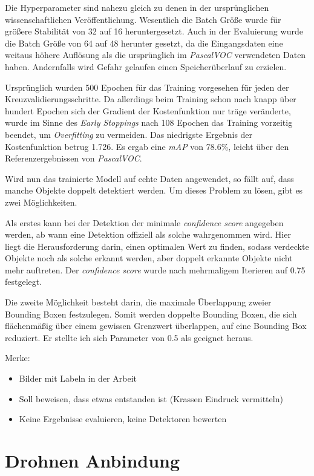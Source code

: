 Die Hyperparameter sind nahezu gleich zu denen in der ursprünglichen wissenschaftlichen Veröffentlichung. Wesentlich die Batch Größe wurde für größere Stabilität von 32 auf 16 heruntergesetzt. Auch in der Evaluierung wurde die Batch Größe von 64 auf 48 herunter gesetzt, da die Eingangsdaten eine weitaus höhere Auflösung als die ursprünglich im \textit{PascalVOC} verwendeten Daten haben. Andernfalls wird Gefahr gelaufen einen Speicherüberlauf zu erzielen. 

Ursprünglich wurden 500 Epochen für das Training vorgesehen für jeden der Kreuzvalidierungsschritte. Da allerdings beim Training schon nach knapp über hundert Epochen sich der Gradient der Kostenfunktion nur träge veränderte, wurde im Sinne des \textit{Early Stoppings} nach 108 Epochen das Training vorzeitig beendet, um \textit{Overfitting} zu vermeiden. Das niedrigste Ergebnis der Kostenfunktion betrug 1.726. Es ergab eine \textit{mAP} von 78.6\%, leicht über den Referenzergebnissen von \textit{PascalVOC}. 

Wird nun das trainierte Modell auf echte Daten angewendet, so fällt auf, dass manche Objekte doppelt detektiert werden. Um dieses Problem zu lösen, gibt es zwei Möglichkeiten. 

Als erstes kann bei der Detektion der minimale \textit{confidence score} angegeben werden, ab wann eine Detektion offiziell als solche wahrgenommen wird. Hier liegt die Herausforderung darin, einen optimalen Wert zu finden, sodass verdeckte Objekte noch als solche erkannt werden, aber doppelt erkannte Objekte nicht mehr auftreten. Der \textit{confidence score} wurde nach mehrmaligem Iterieren auf 0.75 festgelegt.

Die zweite Möglichkeit besteht darin, die maximale Überlappung zweier Bounding Boxen festzulegen. Somit werden doppelte Bounding Boxen, die sich flächenmäßig über einem gewissen Grenzwert überlappen, auf eine Bounding Box reduziert. Er stellte ich sich Parameter von 0.5 als geeignet heraus.

Merke:

\begin{itemize}
	\item Bilder mit Labeln in der Arbeit
	\item Soll beweisen, dass etwas entstanden ist (Krassen Eindruck vermitteln)
	\item Keine Ergebnisse evaluieren, keine Detektoren bewerten
\end{itemize}

\section{Drohnen Anbindung}

